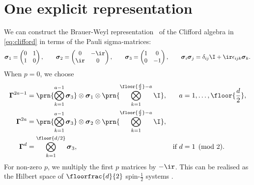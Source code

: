 \documentclass[11pt]{article}
\newcommand{\Gammab}{\boldsymbol{\Gamma}}
\newcommand{\sigmab}{\boldsymbol{\sigma}}
\begin{document}

\section{One explicit representation}\label{sec:explicit}

We can construct the Brauer-Weyl representation~\cite{brauer1935spinors} of the Clifford algebra in \cref{eq:clifford} in terms of the Pauli sigma-matrices:
%
\begin{equation}\label{eq:paulisigma}
  \sigmab_1 = \begin{pmatrix}
                0 & 1 \\
                1 & 0 \\
              \end{pmatrix}
  , \qquad
  \sigmab_2 = \begin{pmatrix}
                0   & -\ir \\
                \ir & 0    \\
              \end{pmatrix}
  , \qquad
  \sigmab_3 = \begin{pmatrix}
                1 & 0  \\
                0 & -1 \\
              \end{pmatrix}
  , \qquad
  \sigmab_i \sigmab_j = \delta_{ij} \I + \ir \epsilon_{ijk} \sigmab_k.
\end{equation}
%
When $p=0$, we choose
%
\begin{equation}\label{eq:explicit}
\begin{aligned}
  \Gammab^{2a-1} &= \prn{\bigotimes_{k=1}^{a-1} \sigmab_3}
                    \otimes \sigmab_1 \otimes
                    \prn{\bigotimes_{k=1}^{\floor{\frac{d}{2}}-a} \I}, &
    a &= 1, \ldots, \floor{\frac{d}{2}}, \\
  \Gammab^{2a} &= \prn{\bigotimes_{k=1}^{a-1} \sigmab_3}
                  \otimes \sigmab_2 \otimes
                  \prn{\bigotimes_{k=1}^{\floor{\frac{d}{2}}-a} \I}, \\
  \Gammab^d &= \bigotimes_{k=1}^{\floor{d/2}} \sigmab_3, &
    \text{if }
    d &= 1 \pmod 2.
\end{aligned}
\end{equation}
%
For non-zero $p$, we multiply the first $p$ matrices by $-\ir$.
This can be realised as the Hilbert space of $\floorfrac{d}{2}$ spin-$\frac{1}{2}$ systems
\cite{Strathdee:1987jr,strathdee1986extended}.
\end{document}
